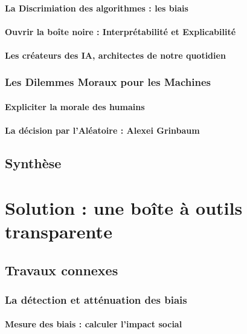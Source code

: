 \documentclass[10pt, french, a4paper]{report}
\begin{document}
\subsubsection{La Discrimiation des algorithmes : les biais}

\subsubsection{Ouvrir la boîte noire : Interprétabilité et Explicabilité}

\subsubsection{Les créateurs des IA, architectes de notre quotidien}

\subsection{Les Dilemmes Moraux pour les Machines}

\subsubsection{Expliciter la morale des humains}

\subsubsection{La décision par l'Aléatoire : Alexei Grinbaum}

\section{Synthèse}

\newpage
\chapter{Solution : une boîte à outils transparente}

\section{Travaux connexes}

\subsection{La détection et atténuation des biais}

\subsubsection{Mesure des biais : calculer l'impact social}
\end{document}
